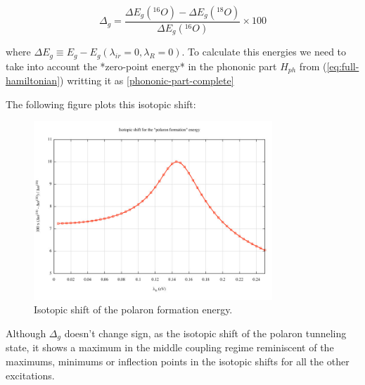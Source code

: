 \begin{equation}
\Delta_g = \frac{\Delta E_g(^{16}O)- \Delta E_g(^{18}O)}{\Delta E_g(^{16}O)} \times 100 \end{equation}

where $\Delta E_g \equiv E_g - E_g(\lambda_{ir}=0, \lambda_R=0)$. To calculate this energies we need to take into account the *zero-point energy* in the phononic part $H_{ph}$ from (\ref{eq:full-hamiltonian}) writting it as \ref{phononic-part-complete}

The following figure plots this isotopic shift:

\begin{figure}[ht!]
\centering
\includegraphics[width=0.8\textwidth]{images/isot_polaron_formation.jpg}
\caption{Isotopic shift of the polaron formation energy.}
\label{fig:isot_polaron_formation}
\end{figure}

Although $\Delta_g$ doesn't change sign, as the isotopic shift of the polaron tunneling state, it shows a maximum in the middle coupling regime reminiscent of the maximums, minimums or inflection points in the isotopic shifts for all the other excitations.